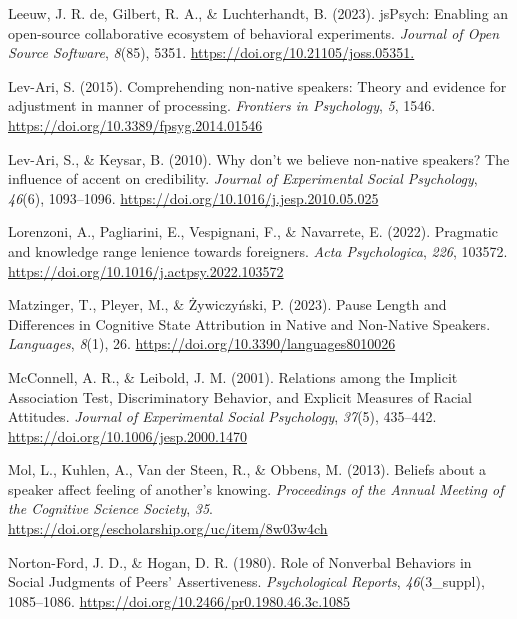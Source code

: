 \documentclass[
  man,floatsintext]{apa7}
\newlength{\cslhangindent}
\newlength{\cslentryspacingunit} %
\newenvironment{CSLReferences}[2] %
 {%
  \setlength{\parindent}{0pt}
  \ifodd #1
  \let\oldpar\par
  \def\par{\hangindent=\cslhangindent\oldpar}
  \fi
  \setlength{\parskip}{#2\cslentryspacingunit}
 }%
 {}
\begin{document}
\begin{CSLReferences}{1}{0}
\leavevmode{}%
Leeuw, J. R. de, Gilbert, R. A., \& Luchterhandt, B. (2023). jsPsych: Enabling an open-source collaborative ecosystem of behavioral experiments. \emph{Journal of Open Source Software}, \emph{8}(85), 5351. \url{https://doi.org/10.21105/joss.05351.}

\leavevmode{}%
Lev-Ari, S. (2015). Comprehending non-native speakers: Theory and evidence for adjustment in manner of processing. \emph{Frontiers in Psychology}, \emph{5}, 1546. \url{https://doi.org/10.3389/fpsyg.2014.01546}

\leavevmode{}%
Lev-Ari, S., \& Keysar, B. (2010). Why don't we believe non-native speakers? {The influence of accent on credibility}. \emph{Journal of Experimental Social Psychology}, \emph{46}(6), 1093--1096. \url{https://doi.org/10.1016/j.jesp.2010.05.025}

\leavevmode{}%
Lorenzoni, A., Pagliarini, E., Vespignani, F., \& Navarrete, E. (2022). Pragmatic and knowledge range lenience towards foreigners. \emph{Acta Psychologica}, \emph{226}, 103572. \url{https://doi.org/10.1016/j.actpsy.2022.103572}

\leavevmode{}%
Matzinger, T., Pleyer, M., \& Żywiczyński, P. (2023). Pause {L}ength and {D}ifferences in {C}ognitive {S}tate {A}ttribution in {N}ative and {N}on-{N}ative {S}peakers. \emph{Languages}, \emph{8}(1), 26. \url{https://doi.org/10.3390/languages8010026}

\leavevmode{}%
McConnell, A. R., \& Leibold, J. M. (2001). {R}elations among the {I}mplicit {A}ssociation {T}est, {D}iscriminatory {B}ehavior, and {E}xplicit {M}easures of {R}acial {A}ttitudes. \emph{Journal of Experimental Social Psychology}, \emph{37}(5), 435--442. \url{https://doi.org/10.1006/jesp.2000.1470}

\leavevmode{}%
Mol, L., Kuhlen, A., Van der Steen, R., \& Obbens, M. (2013). Beliefs about a speaker affect feeling of another's knowing. \emph{Proceedings of the Annual Meeting of the Cognitive Science Society}, \emph{35}. \url{https://doi.org/escholarship.org/uc/item/8w03w4ch}

\leavevmode{}%
Norton-Ford, J. D., \& Hogan, D. R. (1980). Role of {N}onverbal {B}ehaviors in {S}ocial {J}udgments of {P}eers' {A}ssertiveness. \emph{Psychological Reports}, \emph{46}(3\_suppl), 1085--1086. \url{https://doi.org/10.2466/pr0.1980.46.3c.1085}


\end{CSLReferences}
\end{document}
